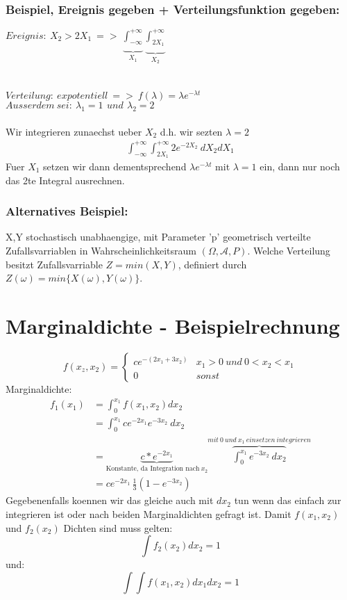 \documentclass{article}
\begin{document}
	\subsubsection{Beispiel, Ereignis gegeben + Verteilungsfunktion gegeben:}
	$Ereignis: \: X_2 > 2X_1 \: => \: \underbrace{\int_{-\infty}^{+\infty}}_{X_1}
	\underbrace{\int_{2X_1}^{+\infty}}_{X_2}$\\ \\ \\
	$Verteilung: \: expotentiell \: => \: f(\lambda) = \lambda e^{-\lambda t}$ \\
	$Ausserdem \: sei: \:  \lambda_1 = 1 \:\, und \:\, \lambda_2 =2 $\\ \\
	Wir integrieren zunaechst ueber $X_2$ d.h. wir sezten $\lambda = 2$
	\[
		\begin{split}
			\int_{-\infty}^{+\infty} \int_{2X_1}^{+\infty} 2 e^{-2 X_2} \: dX_2 dX_1
		\end{split}
	\]
	Fuer $X_1$ setzen wir dann dementsprechend  $\lambda e^{-\lambda t}$ mit $\lambda = 1$ ein, dann nur noch das 2te Integral ausrechnen.
	\subsubsection{Alternatives Beispiel:}
	X,Y stochastisch unabhaengige, mit Parameter 'p' geometrisch verteilte Zufallsvarriablen 	in Wahrscheinlichkeitsraum $(\varOmega , \mathcal{A},P)$. Welche Verteilung besitzt 
Zufallsvarriable $Z = min(X,Y)$, definiert durch $Z( \omega ) = min \{X(\omega),Y(\omega)\}$.\\


\section{Marginaldichte - Beispielrechnung}
\[	
f(x_z,x_2)=
	\begin{cases}
		ce^{-(2x_1+3x_2)} & x_1  > 0 \: und \: 0 < x_2 <x_1 \\
		0 & sonst
	\end{cases}
\]
Marginaldichte:
\[
	\begin{split}
		f_1(x_1) 	& = \int_{0}^{x_1} f(x_1,x_2) dx_2 \\
					& = \int_{0}^{x_1} ce^{-2x_1}e^{-3x_2} \: dx_2 \\
					& = \underbrace{c*e^{-2x_1}}_{\text{Konstante, da Integration nach} \: x_2}  \overbrace{\int_{0}^{x_1} e^{-3x_2} \: dx_2}^{mit \: 0 \: und \: x_1 \: einsetzen \: integrieren} \\
					& = ce^{-2x_1}\, \frac{1}{3} (1-e^{-3x_2} )
	\end{split}
\]
Gegebenenfalls koennen wir das gleiche auch mit $dx_2$ tun wenn das einfach zur integrieren ist oder nach beiden Marginaldichten gefragt ist.
Damit $f(x_1,x_2)$ und $f_2(x_2)$ Dichten sind muss gelten:
\[
	\int f_2(x_2) dx_2 = 1
\]
und:
\[
	\int \int f(x_1,x_2) dx_1 dx_2 = 1
\]
\end{document}
